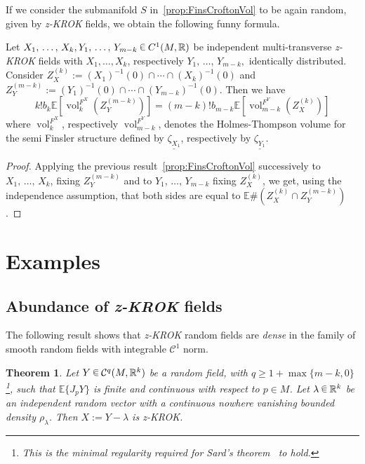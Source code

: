 \documentclass[10pt]{amsart}
\newtheorem{theo}{Theorem}[section]
\theoremstyle{definition}\newtheorem{defi}[theo]{Definition}\newtheorem{rema}[theo]{Remark}\newtheorem{exam}[theo]{Example}\newtheorem{exem}[theo]{Example}\newtheorem{nota}[theo]{Notation}
\newcommand{\R}{\mathbb{R}}
\newcommand{\EE}{\mathbb{E}}
\DeclareMathOperator{\vol}{vol}
\newcommand{\mC}{\mathcal{C}}
\newcommand{\seg}{\underline}
\newcommand{\zkrok}{\emph{z-KROK}\xspace}
\newcommand{\uball}{b}
\newcommand*\randin{
\mathchoice {\raisebox{-.35ex}{$\displaystyle{^\subset}$}\mkern-11.5mu\raisebox{+.45ex}{$\displaystyle{_\subset}$}} {\mkern+1mu\raisebox{-.27ex}{$\textstyle{^\subset}$}\mkern-11.7mu\raisebox{+.45ex}{$\textstyle{_\subset}$}} {\raisebox{.35ex}{$\scriptstyle\subset$}\mkern-14mu\raisebox{-.15ex}{$\scriptstyle\subset$}} {\raisebox{.3ex}{$\scriptscriptstyle\subset$}\mkern-13.5mu\raisebox{-.10ex}{$\scriptscriptstyle\subset$}}}
\begin{document}
If we consider the submanifold $S$ in~\cref{prop:FinsCroftonVol} to be again random, given by \zkrok fields, we obtain the following funny formula.

\begin{coro}\label{cor:funny}
Let $X_1,\,\ldots,\,X_k,Y_1,\,\ldots,\,Y_{m-k}\,\randin\, C^1(M,\R)$ be independent multi-transverse \zkrok fields with $X_1,\ldots,X_k$, respectively $Y_1,\,\ldots,\,Y_{m-k},$ identically distributed. Consider $Z_X^{(k)}:=(X_1)^{-1}(0)\cap\cdots\cap (X_k)^{-1}(0)$ and $Z_Y^{(m-k)}:=(Y_1)^{-1}(0)\cap\cdots\cap (Y_{m-k})^{-1}(0)$. Then we have
\begin{equation*}
k!\uball_k\EE\left[\vol_k^{F^X}\left(Z_Y^{(m-k)}\right)\right]=(m-k)!\uball_{m-k}\EE\left[\vol_{m-k}^{F^Y}\left(Z_X^{(k)}\right)\right]
\end{equation*}
where $\vol_k^{F^X}$, respectively $\vol_{m-k}^{F^Y}$, denotes the Holmes-Thompson volume for the semi Finsler structure defined by $\seg{\zeta_{X_1}}$, respectively by $\seg{\zeta_{Y_1}}$.
\end{coro}

\begin{proof}
Applying the previous result~\cref{prop:FinsCroftonVol} successively to $X_1,\,\ldots,\,X_k$, fixing $Z_Y^{(m-k)}$ and to $Y_1,\,\ldots,\,Y_{m-k}$ fixing $Z_X^{(k)}$, we get, using the independence assumption, that both sides are equal to $\EE\#(Z_X^{(k)}\cap Z_Y^{(m-k)})$.
\end{proof}


\section{Examples}\label{sec:ex}
\subsection{Abundance of {\zkrok} fields}\label{sub:abu}

The following result shows that \zkrok random fields are \emph{dense} in the family of smooth random fields with integrable $\mC^1$ norm.

\begin{theo}\label{thm:abundance}
Let $Y\,\randin\, \mC^q(M,\R^k)$ be a random field, with $q\ge 1+\max\{m-k,0\}$\footnote{This is the minimal regularity required for Sard's theorem~\cite{sard} to hold.}, such that $\EE\{J_pY\}$ is finite and continuous with respect to $p\in M$. Let $\lambda\,\randin\, \R^k$ be an independent random vector with a continuous nowhere vanishing bounded density $\rho_\lambda$. Then $X:=Y-\lambda$ is \zkrok.
\end{theo}
\end{document}
